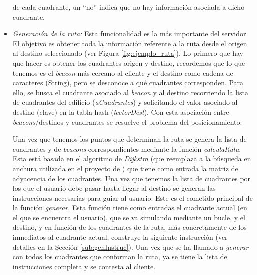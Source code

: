 \begin{itemize}
de cada cuadrante, un ``no'' indica que no hay información asociada a dicho cuadrante. %
	
	  
	\item \textit{Generación de la ruta:} Esta funcionalidad es la más importante del servidor. El objetivo es obtener toda la información referente a la ruta desde el origen al destino seleccionado (ver Figura \ref{fig:ejemplo_ruta}). Lo primero que hay que hacer es obtener los cuadrantes origen y destino, recordemos que lo que tenemos es el \textit{beacon} más cercano al cliente y el destino como cadena de caracteres (String), pero se desconoce a qué cuadrantes corresponden. Para ello, se busca el cuadrante asociado al \textit{beacon} y al destino recorriendo la lista de cuadrantes del edificio (\textit{aCuadrantes}) y solicitando el valor asociado al destino (clave) en la tabla hash (\textit{lectorDest}). Con esta asociación entre \textit{beacons}/destinos y cuadrantes se resuelve el problema del posicionamiento. 
	
	Una vez que tenemos los puntos que determinan la ruta se genera la lista de cuadrantes y de \textit{beacons} correspondientes mediante la función \textit{calculaRuta}. Esta está basada en el algoritmo de \textit{Dijkstra} (que reemplaza a la búsqueda en anchura utilizada en el proyecto de \cite{TFGguia}) que tiene como entrada la matriz de adyacencia de los cuadrantes. Una vez que tenemos la lista de cuadrantes por los que el usuario debe pasar hasta llegar al destino se generan las instrucciones necesarias para guiar al usuario. Este es el cometido principal de la función \textit{generar}. Esta función tiene como entradas el cuadrante actual (en el que se encuentra el usuario), que se va simulando mediante un bucle, y el destino, y en función de los cuadrantes de la ruta, más concretamente de los inmediatos al cuadrante actual, construye la siguiente instrucción (ver detalles en la Sección \ref{sub:genInstruc}). Una vez que se ha llamado a \textit{generar} con todos los cuadrantes que conforman la ruta, ya se tiene la lista de instrucciones completa y se contesta al cliente.
\end{itemize}


